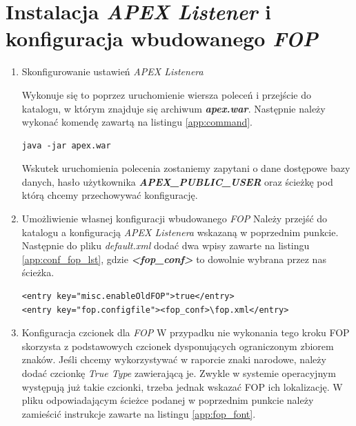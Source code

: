 \documentclass[11pt,a4paper]{article}
\begin{document}
\section{Instalacja \emph{APEX Listener} i konfiguracja wbudowanego \emph{FOP}} \label{app:conf_fop}
\begin{enumerate}
\item Skonfigurowanie ustawień \emph{APEX Listenera}

Wykonuje się to poprzez uruchomienie wiersza poleceń i przejście do katalogu, w którym znajduje się archiwum \emph{\textbf{apex.war}}. Następnie należy wykonać komendę zawartą na listingu \ref{app:command}. 

\lstset{language=XML}
\begin{lstlisting}[frame=single,caption=Komenda służąca do konfiguracji \emph{APEX Listenera},label=app:command]
java -jar apex.war
\end{lstlisting}

Wskutek uruchomienia polecenia zostaniemy zapytani o dane dostępowe bazy danych, hasło użytkownika \emph{\textbf{APEX\_PUBLIC\_USER}} oraz ścieżkę pod którą chcemy przechowywać konfigurację. 

\item{Umożliwienie własnej konfiguracji wbudowanego \emph{FOP}}
Należy przejść do katalogu a konfiguracją \emph{APEX Listenera} wskazaną w poprzednim punkcie. Następnie do pliku \emph{default.xml} dodać dwa wpisy zawarte na listingu \ref{app:conf_fop_lst}, gdzie \textbf{\emph{\textless fop\_conf\textgreater}} to dowolnie wybrana przez nas ścieżka.

\lstset{language=XML}
\begin{lstlisting}[frame=single,caption=Wpisy do zawarcia w konfiguracji \emph{APEX Listenera},label=app:conf_fop_lst]
<entry key="misc.enableOldFOP">true</entry>
<entry key="fop.configfile"><fop_conf>\fop.xml</entry>
\end{lstlisting}

\item Konfiguracja czcionek dla \emph{FOP}
W przypadku nie wykonania tego kroku FOP skorzysta z podstawowych czcionek dysponujących ograniczonym zbiorem znaków. Jeśli chcemy wykorzystywać w raporcie znaki narodowe, należy dodać czcionkę \emph{True Type} zawierającą je. Zwykle w systemie operacyjnym występują już takie czcionki, trzeba jednak wskazać FOP ich lokalizację. W pliku odpowiadającym ścieżce podanej w poprzednim punkcie należy zamieścić instrukcje zawarte na listingu \ref{app:fop_font}. 


\end{enumerate}
\end{document}
